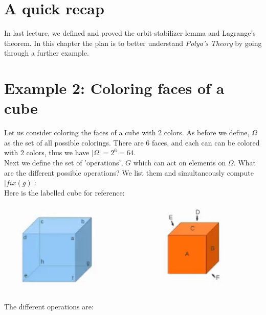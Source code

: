 \section{A quick recap}
 In last lecture, we defined and proved the orbit-stabilizer lemma and Lagrange's theorem. In this chapter the plan is to better understand \emph{Polya's Theory} by going through a further example. 

\section{Example 2: Coloring faces of a cube}
Let us consider coloring the faces of a cube with $2$ colors. As before we define, $\Omega$ as the set of all possible colorings. There are $6$ faces, and each can can be colored with $2$ colors, thus we have $|\Omega| = 2^6 = 64$.
\\
Next we define the set of 'operations', $G$ which can act on elements on $\Omega$. What are the different possible operations? We list them and simultaneously compute $|fix(g)|$:
\\
Here is the labelled cube for reference:
\\
\includegraphics[]{./images/cube.png}
\\
The different operations are:
